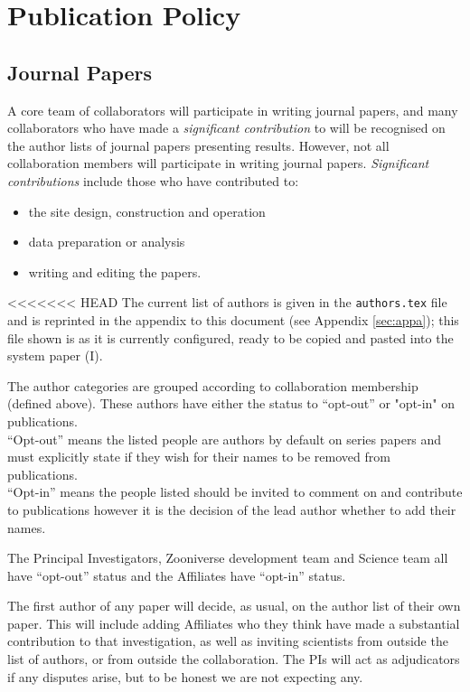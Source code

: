 \documentclass[a4paper]{article}
\begin{document}

\section{Publication Policy}
\label{sec:publ}

\subsection{Journal Papers}
\label{sec:series}

A core team of collaborators will participate in writing journal papers, and
many collaborators who have made a \textit{significant contribution} to \sw
will be recognised on the author lists of journal papers presenting \sw
results.  However, not all collaboration members will participate in writing
journal papers.  \textit{Significant contributions} include those who have
contributed to:
\begin{itemize}
\item the site design, construction and operation
\item data preparation or analysis
\item writing and editing the papers. 
\end{itemize}


<<<<<<< HEAD
The current list of \sw authors is given in the \texttt{authors.tex} file and is reprinted
in the appendix to this document (see Appendix \ref{sec:appa}); this file shown is as it is currently configured, ready to be copied and pasted into the \sw system paper (\sw I). 

\noindent The author categories are grouped according to collaboration membership (defined above). These authors have either the status to ``opt-out'' or "opt-in" on \sw publications.  \\
``Opt-out'' means the listed people are authors by default on \sw series papers and must explicitly state if they wish for their names to be removed from \sw publications. \\
``Opt-in'' means the people listed should be invited to comment on and contribute to publications however it is the decision of the lead author whether to add their names.

The Principal Investigators, Zooniverse development team and \sw Science team all have ``opt-out'' status and the \sw Affiliates have ``opt-in'' status.

The first author of any \sw paper will decide, as usual, on the author list of their own paper. This will include adding Affiliates who they think have made a substantial contribution to that investigation, as well as inviting scientists from outside the list of \sw authors, or from outside the
collaboration.  The \sw PIs will act as adjudicators if any disputes arise, but to be honest we are not expecting any.
\end{document}
